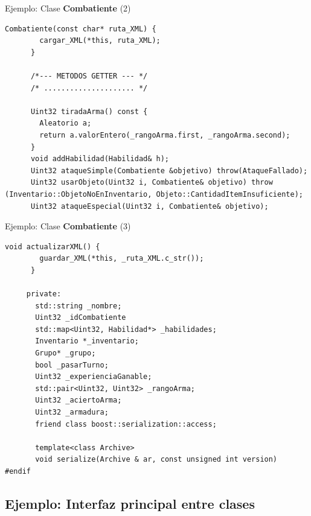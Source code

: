 \documentclass[9pt,xcolor=svgnames]{beamer}
\begin{document}
  \begin{frame}[fragile=singleslide]{Ejemplo: Clase \textbf{Combatiente} (2)}
   \transdissolve

   \begin{lstlisting}[style=C++]                  
      Combatiente(const char* ruta_XML) {
        cargar_XML(*this, ruta_XML);
      }

      /*--- METODOS GETTER --- */
      /* ..................... */

      Uint32 tiradaArma() const {
        Aleatorio a;
        return a.valorEntero(_rangoArma.first, _rangoArma.second);
      }
      void addHabilidad(Habilidad& h);
      Uint32 ataqueSimple(Combatiente &objetivo) throw(AtaqueFallado);
      Uint32 usarObjeto(Uint32 i, Combatiente& objetivo) throw (Inventario::ObjetoNoEnInventario, Objeto::CantidadItemInsuficiente);
      Uint32 ataqueEspecial(Uint32 i, Combatiente& objetivo);   
   \end{lstlisting}
   
  \end{frame}

  \begin{frame}[fragile=singleslide]{Ejemplo: Clase \textbf{Combatiente} (3)}
   \transdissolve
   \begin{lstlisting}[style=C++]
      void actualizarXML() {
        guardar_XML(*this, _ruta_XML.c_str());
      }

     private:
       std::string _nombre;
       Uint32 _idCombatiente
       std::map<Uint32, Habilidad*> _habilidades;
       Inventario *_inventario;
       Grupo* _grupo;
       bool _pasarTurno;
       Uint32 _experienciaGanable;
       std::pair<Uint32, Uint32> _rangoArma;
       Uint32 _aciertoArma;
       Uint32 _armadura;
       friend class boost::serialization::access;

       template<class Archive>
       void serialize(Archive & ar, const unsigned int version)
#endif
   \end{lstlisting}
 \end{frame}
  
  \subsection{Ejemplo: Interfaz principal entre clases}
\end{document}
